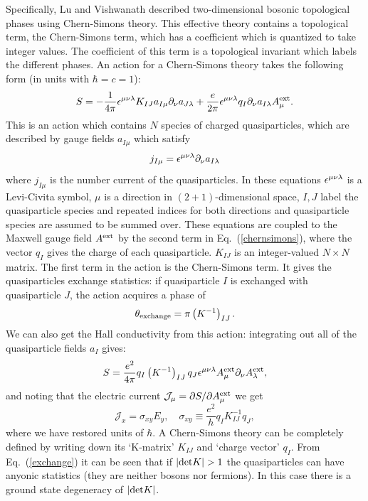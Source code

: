 Specifically, Lu and Vishwanath described two-dimensional bosonic topological phases using Chern-Simons theory. This effective theory contains a topological term, the Chern-Simons term, which has a coefficient which is quantized to take integer values. The coefficient of this term is a topological invariant which labels the different phases. An action for a Chern-Simons theory takes the following form (in units with $\hbar=c=1$):\cite{Wen_book}
\begin{equation}
S=-\frac{1}{4\pi}\epsilon^{\mu\nu\lambda} K_{IJ}a_{I\mu}\partial_{\nu}a_{J\lambda} +\frac{e}{2\pi}\epsilon^{\mu\nu\lambda} q_I\partial_\nu a_{I\lambda}A^{\rm ext}_{\mu}.
\label{chernsimons}
\end{equation}
This is an action which contains $N$ species of charged quasiparticles, which are described by gauge fields $a_{I\mu}$ which satisfy 
\begin{equation}
j_{I\mu}=\epsilon^{\mu\nu\lambda} \partial_\nu a_{I\lambda}
\end{equation}
where $j_{I\mu}$ is the number current of the quasiparticles. In these equations $\epsilon^{\mu\nu\lambda}$ is a Levi-Civita symbol, $\mu$ is a direction in $(2+1)$-dimensional space, $I,J$ label the quasiparticle species and repeated indices for both directions and quasiparticle species are assumed to be summed over. These equations are coupled to the Maxwell gauge field $A^{\rm ext}$ by the second term in Eq.~(\ref{chernsimons}), where the vector $q_I$ gives the charge of each quasiparticle. $K_{IJ}$ is an integer-valued $N\times N$ matrix. The first term in the action is the Chern-Simons term. It gives the quasiparticles exchange statistics: if quasiparticle $I$ is exchanged with quasiparticle $J$, the action acquires a phase of 
\begin{equation}
\theta_{\rm exchange}=\pi \left(K^{-1}\right)_{IJ}.
\label{exchange}
\end{equation}
 We can also get the Hall conductivity from this action: integrating out all of the quasiparticle fields $a_I$ gives:
\begin{equation}
S=\frac{e^2}{4\pi} q_I \left(K^{-1}\right)_{IJ} q_J \epsilon^{\mu\nu\lambda} A^{\rm ext}_\mu \partial_\nu A^{\rm ext}_\lambda,
\label{externalCS}
\end{equation}
and noting that the electric current $\mathcal{J}_\mu=\partial S/\partial A^{\rm ext}_\mu$ we get
\begin{equation}
\mathcal{J}_x=\sigma_{xy} E_y,\quad \sigma_{xy}\equiv \frac{e^2}{h}q_I K_{IJ}^{-1} q_J,
\end{equation}
where we have restored units of $\hbar$. A Chern-Simons theory can be completely defined by writing down its `K-matrix' $K_{IJ}$ and `charge vector' $q_I$. From Eq.~(\ref{exchange}) it can be seen that if $|{\rm det}K|>1$ the quasiparticles can have anyonic statistics (they are neither bosons nor fermions). In this case there is a ground state degeneracy of $|{\rm det}K|$. 

